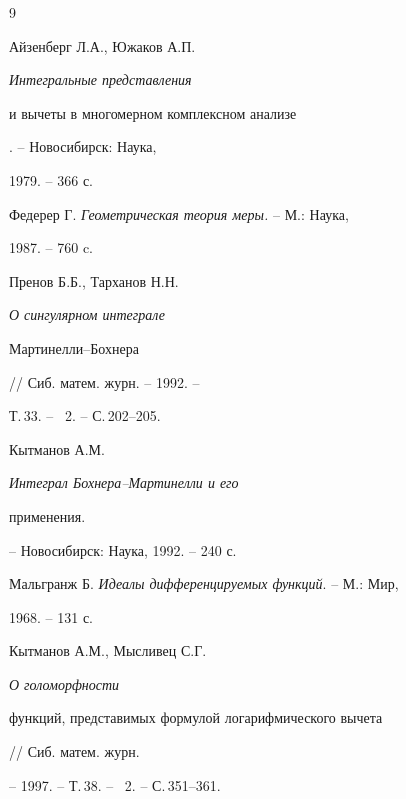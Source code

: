 \begin{thebibliography}{9}




Айзенберг Л.А., Южаков А.П. {\it Интегральные представления


и вычеты в многомерном комплексном анализе}. -- Новосибирск: Наука,


1979. -- 366 с.




Федерер Г. {\it Геометрическая теория меры.} -- М.: Наука,


1987. -- 760 c.




Пренов Б.Б., Тарханов Н.Н. {\it О сингулярном интеграле


Мартинелли--Бохнера} // Сиб. матем. журн. -- 1992. --


Т.\,33. -- \No\, 2. -- С.\,202--205.




Кытманов А.М. {\it Интеграл Бохнера--Мартинелли и его


применения.} -- Новосибирск: Наука, 1992. -- 240 с.




Мальгранж Б. {\em Идеалы дифференцируемых функций}. -- М.: Мир,


1968. -- 131 с.




Кытманов А.М., Мысливец С.Г. {\it О голоморфности


функций, представимых формулой логарифмического вычета} // Сиб. матем. журн.


-- 1997. -- Т.\,38. -- \No\, 2. -- С.\,351--361.





\end{thebibliography}





\vskip 2cm














\label{end}








